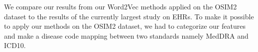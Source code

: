 We compare our results from our Word2Vec methods applied on the OSIM2 dataset to the results of the currently largest study on EHRs. To make it possible to apply our methods on the OSIM2 dataset, we had to categorize our features and make a disease code mapping between two standards namely MedDRA and ICD10. 

